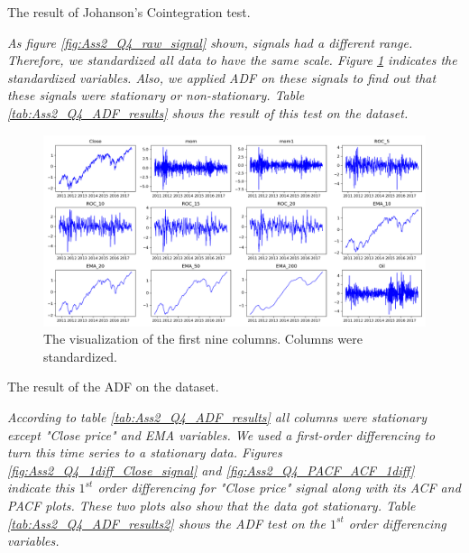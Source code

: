 \begin{table}[H]
\centering
\caption{The result of Johanson's Cointegration test.}
\label{tab:Ass2_Q4_coin}

\end{table}


\textit{As figure \ref{fig:Ass2_Q4_raw_signal} shown, signals had a different range. Therefore, we standardized all data to have the same scale. Figure \ref{fig:Ass2_Q4_standard_data} indicates the standardized variables. Also, we applied \gls{ADF} on these signals to find out that these signals were stationary or non-stationary. Table \ref{tab:Ass2_Q4_ADF_results} shows the result of this test on the dataset.}

\begin{figure}[H]
    \centering
    \begin{minipage}[b]{1\textwidth}
        \includegraphics[width=\textwidth]{figures/Ass2/Ass2_Q4_standard_data.png}
    \end{minipage}
    \caption{The visualization of the first nine columns. Columns were standardized.}
    \label{fig:Ass2_Q4_standard_data}
\end{figure}


\begin{table}[H]
\centering
\caption{The result of the \gls{ADF} on the dataset.}
\label{tab:Ass2_Q4_ADF_results}

\end{table}

\textit{According to table \ref{tab:Ass2_Q4_ADF_results} all columns were stationary except "Close price" and EMA variables.  
We used a first-order differencing to turn this time series to a stationary data. Figures \ref{fig:Ass2_Q4_1diff_Close_signal} and \ref{fig:Ass2_Q4_PACF_ACF_1diff} indicate this $1^{st}$ order differencing for "Close price" signal along with its \gls{ACF} and \gls{PACF} plots. These two plots also show that the data got stationary. Table \ref{tab:Ass2_Q4_ADF_results2} shows the ADF test on the $1^{st}$ order differencing variables.}

